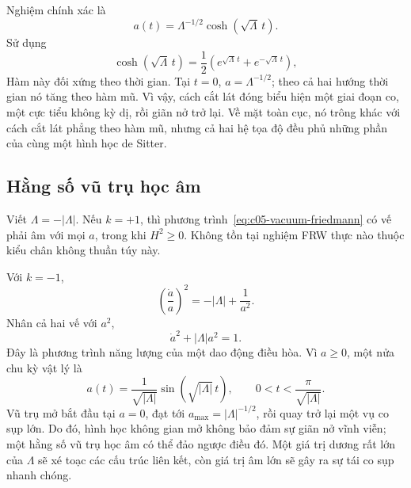Nghiệm chính xác là
\begin{equation}
a(t)=\Lambda^{-1/2}\cosh(\sqrt{\Lambda}\,t).
\label{eq:c05-closed-desitter}
\end{equation}
Sử dụng
\begin{equation}
\cosh(\sqrt{\Lambda}\,t)
=
\frac12\left(e^{\sqrt{\Lambda}\,t}+e^{-\sqrt{\Lambda}\,t}\right),
\end{equation}
Hàm này đối xứng theo thời gian. Tại \(t=0\), \(a=\Lambda^{-1/2}\); theo cả hai hướng thời gian nó tăng theo hàm mũ. Vì vậy, cách cắt lát đóng biểu hiện một giai đoạn co, một cực tiểu không kỳ dị, rồi giãn nở trở lại. Về mặt toàn cục, nó trông khác với cách cắt lát phẳng theo hàm mũ, nhưng cả hai hệ tọa độ đều phủ những phần của cùng một hình học de Sitter.

\subsection{Hằng số vũ trụ học âm}

Viết \(\Lambda=-|\Lambda|\). Nếu \(k=+1\), thì phương trình~\eqref{eq:c05-vacuum-friedmann} có vế phải âm với mọi \(a\), trong khi \(H^2\geq0\). Không tồn tại nghiệm FRW thực nào thuộc kiểu chân không thuần túy này.

Với \(k=-1\),
\begin{equation}
\left(\frac{\dot a}{a}\right)^2=-|\Lambda|+\frac{1}{a^2}.
\end{equation}
Nhân cả hai vế với \(a^2\),
\begin{equation}
\dot a^2+|\Lambda|a^2=1.
\label{eq:c05-negative-lambda-oscillator}
\end{equation}
Đây là phương trình năng lượng của một dao động điều hòa. Vì \(a\geq0\), một nửa chu kỳ vật lý là
\begin{equation}
a(t)=\frac{1}{\sqrt{|\Lambda|}}
\sin\!\left(\sqrt{|\Lambda|}\,t\right),
\qquad
0<t<\frac{\pi}{\sqrt{|\Lambda|}}.
\end{equation}
Vũ trụ mở bắt đầu tại \(a=0\), đạt tới \(a_{\max}=|\Lambda|^{-1/2}\), rồi quay trở lại một vụ co sụp lớn. Do đó, hình học không gian mở không bảo đảm sự giãn nở vĩnh viễn; một hằng số vũ trụ học âm có thể đảo ngược điều đó. Một giá trị dương rất lớn của \(\Lambda\) sẽ xé toạc các cấu trúc liên kết, còn giá trị âm lớn sẽ gây ra sự tái co sụp nhanh chóng.

